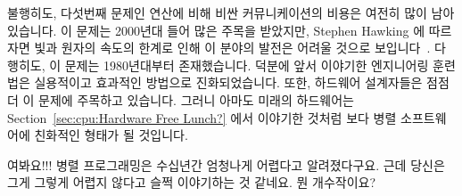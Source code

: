 불행히도, 다섯번째 문제인 연산에 비해 비싼 커뮤니케이션의 비용은 여전히 많이
남아있습니다.
이 문제는 2000년대 들어 많은 주목을 받았지만, Stephen Hawking 에 따르자면 빛과
원자의 속도의 한계로 인해 이 분야의 발전은 어려울 것으로
보입니다~\cite{BryanGardiner2007,GordonMoore03a}.
다행히도, 이 문제는 1980년대부터 존재했습니다.
덕분에 앞서 이야기한 엔지니어링 훈련법은 실용적이고 효과적인 방법으로
진화되었습니다.
또한, 하드웨어 설계자들은 점점 더 이 문제에 주목하고 있습니다.
그러니 아마도 미래의 하드웨어는 Section~\ref{sec:cpu:Hardware Free Lunch?} 에서
이야기한 것처럼 보다 병렬 소프트웨어에 친화적인 형태가 될 것입니다.


\QuickQuiz{}
	여봐요!!!
	병렬 프로그래밍은 수십년간 엄청나게 어렵다고 알려졌다구요.
	근데 당신은 그게 그렇게 어렵지 않다고 슬쩍 이야기하는 것 같네요.
	뭔 개수작이요?


